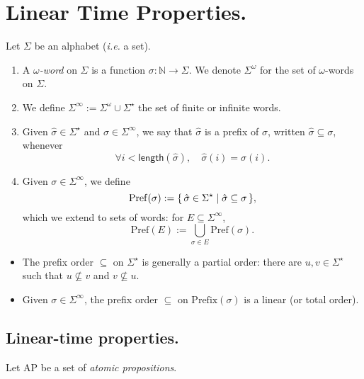 \documentclass[./main]{subfiles}
\begin{document}
  \chapter{Linear Time Properties.}

  \begin{defn}
    Let $\Sigma$ be an alphabet (\textit{i.e.} a set).
    \begin{enumerate}
      \item A \textit{$\omega$-word} on $\Sigma$ is a function $\sigma : \mathds{N} \to \Sigma$.
        We denote $\Sigma^\omega$ for the set of $\omega$-words on $\Sigma$.
      \item We define $\Sigma^\infty := \Sigma^\omega \cup \Sigma^\star$ the set of finite or infinite words.
      \item Given $\hat{\sigma} \in \Sigma^\star$ and $\sigma \in \Sigma^\infty$, we say that $\hat{\sigma}$ is a prefix of $\sigma$, written $\hat{\sigma} \subseteq \sigma$, whenever 
        \[
        \forall i < \mathsf{length}(\hat{\sigma}), \quad \hat{\sigma}(i) = \sigma(i)
        .\]
      \item Given $\sigma \in \Sigma^\infty$, we define \[
        \mathrm{Pref}(\sigma) := \mleft\{\,\hat{\sigma} \in \Sigma^\star \;\middle|\; \hat{\sigma} \subseteq \sigma\,\mright\} 
        ,\]
        which we extend to sets of words: for $E \subseteq \Sigma^\infty$,
        \[
          \mathrm{Pref}(E) := \bigcup_{\sigma \in E} \mathrm{Pref}(\sigma)
        .\]
    \end{enumerate}
  \end{defn}

  \begin{rmk}
    \begin{itemize}
      \item The prefix order $\subseteq$ on $\Sigma^\star$ is generally a partial order: there are $u,v \in \Sigma^\star$ such that $u \not\subseteq v$ and $v \not\subseteq u$.
      \item Given $\sigma \in \Sigma^\infty$, the prefix order $\subseteq$ on $\mathrm{Prefix}(\sigma)$ is a linear (or total order).
    \end{itemize}
  \end{rmk}

  \section{Linear-time properties.}

  Let $\mathrm{AP}$ be a set of \textit{atomic propositions}.
\end{document}
